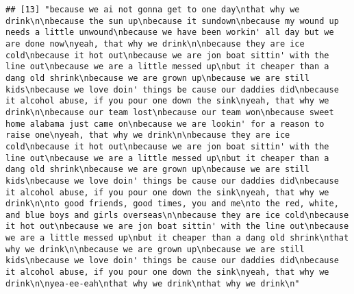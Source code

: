 \documentclass[]{article}
\begin{document}
\begin{verbatim}
## [13] "because we ai not gonna get to one day\nthat why we drink\n\nbecause the sun up\nbecause it sundown\nbecause my wound up needs a little unwound\nbecause we have been workin' all day but we are done now\nyeah, that why we drink\n\nbecause they are ice cold\nbecause it hot out\nbecause we are jon boat sittin' with the line out\nbecause we are a little messed up\nbut it cheaper than a dang old shrink\nbecause we are grown up\nbecause we are still kids\nbecause we love doin' things be cause our daddies did\nbecause it alcohol abuse, if you pour one down the sink\nyeah, that why we drink\n\nbecause our team lost\nbecause our team won\nbecause sweet home alabama just came on\nbecause we are lookin' for a reason to raise one\nyeah, that why we drink\n\nbecause they are ice cold\nbecause it hot out\nbecause we are jon boat sittin' with the line out\nbecause we are a little messed up\nbut it cheaper than a dang old shrink\nbecause we are grown up\nbecause we are still kids\nbecause we love doin' things be cause our daddies did\nbecause it alcohol abuse, if you pour one down the sink\nyeah, that why we drink\n\nto good friends, good times, you and me\nto the red, white, and blue boys and girls overseas\n\nbecause they are ice cold\nbecause it hot out\nbecause we are jon boat sittin' with the line out\nbecause we are a little messed up\nbut it cheaper than a dang old shrink\nthat why we drink\n\nbecause we are grown up\nbecause we are still kids\nbecause we love doin' things be cause our daddies did\nbecause it alcohol abuse, if you pour one down the sink\nyeah, that why we drink\n\nyea-ee-eah\nthat why we drink\nthat why we drink\n"                                                                                                                                                                                                                                                                                                                                                                                                                                                                                                                                                                                                                                                                                                                                                                                                                                                                                                                                                                                                                                                                                                                                                                                                                                                                

\end{verbatim}
\end{document}
